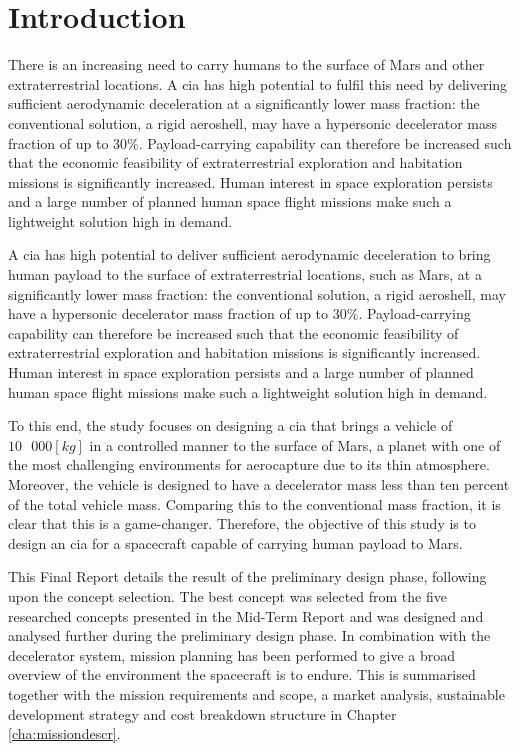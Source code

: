 \section{Introduction}
\label{cha:introduction}
There is an increasing need to carry humans to the surface of Mars and other extraterrestrial locations. A \gls{cia} has high potential to fulfil this need by delivering sufficient aerodynamic deceleration at a significantly lower mass fraction: the conventional solution, a rigid aeroshell, may have a hypersonic decelerator mass fraction of up to $30\%$. Payload-carrying capability can therefore be increased such that the economic feasibility of extraterrestrial exploration and habitation missions is significantly increased. Human interest in space exploration persists and a large number of planned human space flight missions make such a lightweight solution high in demand. 

A \gls{cia} has high potential to deliver sufficient aerodynamic deceleration to bring human payload to the surface of extraterrestrial locations, such as Mars, at a significantly lower mass fraction: the conventional solution, a rigid aeroshell, may have a hypersonic decelerator mass fraction of up to $30\%$. Payload-carrying capability can therefore be increased such that the economic feasibility of extraterrestrial exploration and habitation missions is significantly increased. Human interest in space exploration persists and a large number of planned human space flight missions make such a lightweight solution high in demand. 

To this end, the study focuses on designing a \acrfull{cia} that brings a vehicle of $10\mbox{ }000 [kg]$ in a controlled manner to the surface of Mars, a planet with one of the most challenging environments for aerocapture due to its thin atmosphere. Moreover, the vehicle is designed to have a decelerator mass less than ten percent of the total vehicle mass. Comparing this to the conventional mass fraction, it is clear that this is a game-changer. Therefore, the objective of this study is to design an \gls{cia} for a spacecraft capable of carrying human payload to Mars.

This Final Report details the result of the preliminary design phase, following upon the concept selection. The best concept was selected from the five researched concepts presented in the Mid-Term Report and was designed and analysed further during the preliminary design phase. In combination with the decelerator system, mission planning has been performed to give a broad overview of the environment the spacecraft is to endure. This is summarised together with the mission requirements and scope, a market analysis, sustainable development strategy and cost breakdown structure in Chapter \ref{cha:missiondescr}.

